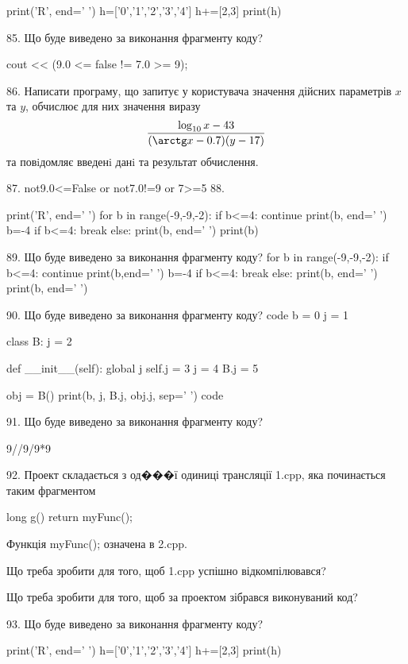 \documentclass[11pt]{article}
\begin{document}
print('R', end=' ')
h=['0','1','2','3','4']
h+=[2,3]
print(h)


85. Що буде виведено за виконання фрагменту коду?

cout << (9.0 <= false != 7.0 >= 9);

86. 
Написати програму, що запитує у користувача значення дійсних параметрів $x$ та $y$, обчислює для них значення виразу 
$$\frac{\log_{10} x - 43}{(\arctg x - 0.7) (y - 17)}$$ 
та повiдомляє введенi данi та результат обчислення.


87. 
not9.0<=False or not7.0!=9 or 7>=5
88. 

print('R', end=' ')
for b in range(-9,-9,-2):
    if b<=4:
        continue
        print(b, end=' ')
        b=-4
    if b<=4:
        break
    else:
        print(b, end=' ')
    print(b)

89. Що буде виведено за виконання фрагменту коду?
for b in range(-9,-9,-2):
    if b<=4:
        continue
        print(b,end=' ')
        b=-4
    if b<=4:
        break
else:
    print(b, end=' ')
print(b, end=' ')

90. Що буде виведено за виконання фрагменту коду?
code
b = 0
j = 1

class B:
    j = 2
    
    def __init__(self):
global j        self.j = 3
        j = 4
        B.j = 5

obj = B()
print(b, j, B.j, obj.j, sep=' ')
code

91. Що буде виведено за виконання фрагменту коду?

9//9/9*9

92. 
Проект складається з од���ї одиниці трансляції 1.cpp, яка починається таким фрагментом\par
long g(){ return myFunc();}\par
Функція myFunc(); означена в 2.cpp.\par
Що треба зробити для того, щоб 1.cpp успішно відкомпілювався?\par\vspace{1.5cm}
Що треба зробити для того, щоб за проектом зібрався виконуваний код?\par

93. Що буде виведено за виконання фрагменту коду?

print('R', end=' ')
h=['0','1','2','3','4']
h+=[2,3]
print(h)
\end{document}
